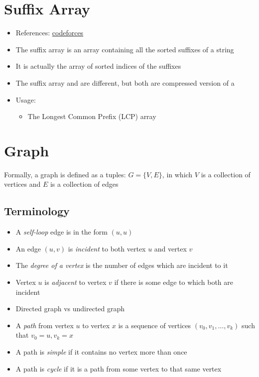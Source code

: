 \section{Suffix Array}
\begin{itemize}
	\item References: \href{https://codeforces.com/edu/course/2/lesson/2/1}{codeforces}
	\item The suffix array is an array containing all the sorted suffixes of a string
	\item It is actually the array of sorted indices of the suffixes
	\item The suffix array and  are different, but both are compressed version of a 
	\item Usage:
	\begin{itemize}
		\item The Longest Common Prefix (LCP) array
	\end{itemize}
\end{itemize}

\section{Graph}
Formally, a graph is defined as a tuples: $G = \{ V, E \}$, in which $V$ is a collection of vertices and $E$ is a collection of edges

\subsection{Terminology}
\begin{itemize}
	\item A \textit{self-loop} edge is in the form $(u, u)$
	\item An edge $(u, v)$ is \textit{incident} to both vertex $u$ and vertex $v$
	\item The \textit{degree of a vertex} is the number of edges which are incident to it
	\item Vertex $u$ is \textit{adjacent} to vertex $v$ if there is some edge to which both are incident
	\item Directed graph \ac{vs} undirected graph
	\item A \textit{path} from vertex $u$ to vertex $x$ is a sequence of vertices $(v_0, v_1, \dots, v_k)$ such that $v_0 = u, v_k = x$
	\item A path is \textit{simple} if it contains no vertex more than once
	\item A path is \textit{cycle} if it is a path from some vertex to that same vertex
\end{itemize}


